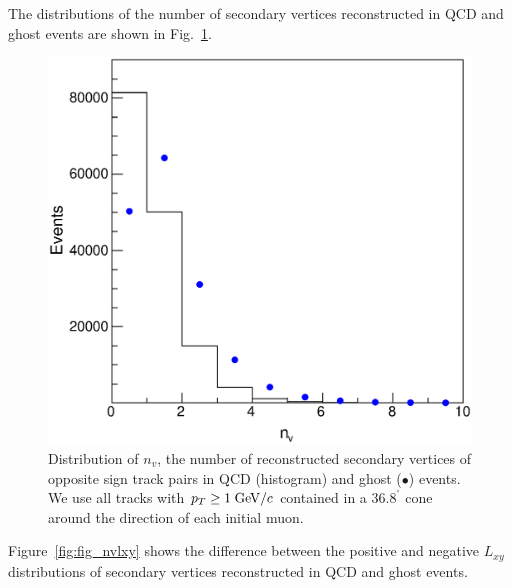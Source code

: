 \documentclass[aps,prd,preprint,floatfix,nofootinbib,superscriptaddress,showpacs,amssymb]{revtex4}
\def\deg{^\circ}
\begin{document}
 The distributions of the number of secondary vertices reconstructed in
 QCD and ghost events are shown in Fig.~\ref{fig:fig_nvi}.
 \begin{figure}
 \begin{center}
 \vspace{-0.3in}
 \leavevmode
 \includegraphics*[width=\textwidth]{nvi.eps}
 \caption[]{Distribution of $n_v$, the number of reconstructed secondary
            vertices of opposite sign track pairs in QCD (histogram) and
            ghost ($\bullet$) events. We use all tracks with
            $p_T \geq 1 \; {\rm GeV/}c$ contained in a $36.8^{\deg}$ cone around
            the direction of each initial muon.}
 \label{fig:fig_nvi}
 \end{center}
 \end{figure}
 Figure~\ref{fig:fig_nvlxy} shows the difference between the positive and
 negative $L_{xy}$ distributions of secondary vertices reconstructed in QCD
 and ghost events.
\end{document}

